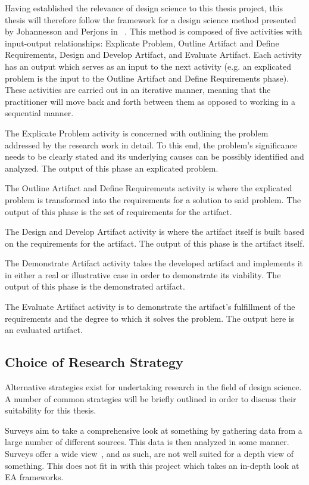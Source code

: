 Having established the relevance of design science to this thesis project, this thesis will therefore follow the framework for a design science method presented by Johannesson and Perjons in ~\cite{johannessonPerjons2012}. This method is composed of five activities with input-output relationships: Explicate Problem, Outline Artifact and Define Requirements, Design and Develop Artifact, and Evaluate Artifact. Each activity has an output which serves as an input to the next activity (e.g. an explicated problem is the input to the Outline Artifact and Define Requirements phase). These activities are carried out in an iterative manner, meaning that the practitioner will move back and forth between them as opposed to working in a sequential manner. 

The Explicate Problem activity is concerned with outlining the problem addressed by the research work in detail. To this end, the problem's significance needs to be clearly stated and its underlying causes can be possibly identified and analyzed. The output of this phase an explicated problem. 

The Outline Artifact and Define Requirements activity is where the explicated problem is transformed into the requirements for a solution to said problem. The output of this phase is the set of requirements for the artifact. 

The Design and Develop Artifact activity is where the artifact itself is built based on the requirements for the artifact. The output of this phase is the artifact itself.

The Demonstrate Artifact activity takes the developed artifact and implements it in either a real or illustrative case in order to demonstrate its viability. The output of this phase is the demonstrated artifact. 

The Evaluate Artifact activity is to demonstrate the artifact's fulfillment of the requirements and the degree to which it solves the problem. The output here is an evaluated artifact. 

\subsection{Choice of Research Strategy}

Alternative strategies exist for undertaking research in the field of design science. A number of common strategies will be briefly outlined in order to discuss their suitability for this thesis. 

Surveys aim to take a comprehensive look at something by gathering data from a large number of different sources. This data is then analyzed in some manner. Surveys offer a wide view~\cite{denscombe2010good,johannessonPerjons2012}, and as such, are not well suited for a depth view of something. This does not fit in with this project which takes an in-depth look at EA frameworks. 

